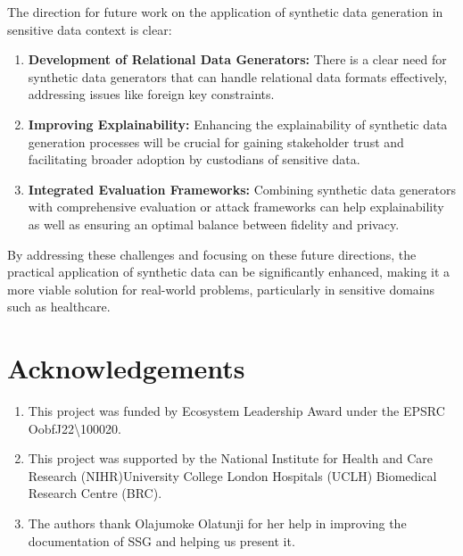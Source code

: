 \documentclass[11pt]{article}
\begin{document}
The direction for future work on the application of synthetic data generation in sensitive data context is clear:

\begin{enumerate}
    \item \textbf{Development of Relational Data Generators: } There is a clear need for synthetic data generators that can handle relational data formats effectively, addressing issues like foreign key constraints.
    \item \textbf{Improving Explainability:} Enhancing the explainability of synthetic data generation processes will be crucial for gaining stakeholder trust and facilitating broader adoption by custodians of sensitive data.
    \item \textbf{Integrated Evaluation Frameworks: }Combining synthetic data generators with comprehensive evaluation or attack frameworks can help explainability as well as ensuring an optimal balance between fidelity and privacy.
\end{enumerate}

By addressing these challenges and focusing on these future directions, the practical application of synthetic data can be significantly enhanced, making it a more viable solution for real-world problems, particularly in sensitive domains such as healthcare.


\section{Acknowledgements}

\begin{enumerate}
    \item This project was funded by Ecosystem Leadership Award under the EPSRC OobfJ22\textbackslash100020.
    \item This project was supported by the National Institute for Health and Care Research (NIHR)University College London Hospitals (UCLH) Biomedical Research Centre (BRC).
    \item  The authors thank Olajumoke Olatunji for her help in improving the documentation of SSG and helping us present it.
\end{enumerate}



\end{document}
